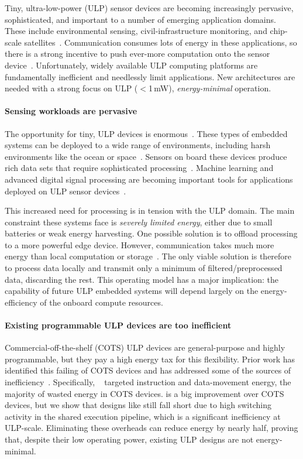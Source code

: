 Tiny, ultra-low-power (ULP) sensor devices are becoming increasingly pervasive, sophisticated, and important to a number of emerging application domains.
% 
These include environmental sensing, civil-infrastructure monitoring, and chip-scale satellites~\cite{kicksat2}.
%
Communication consumes lots of energy in these applications,
so there is a strong incentive to push ever-more computation onto the sensor device~\cite{sonic}.
% 
Unfortunately, widely available ULP computing platforms are fundamentally inefficient and needlessly limit applications.
%
New architectures are needed with a strong focus on ULP ($<$1\,mW), \emph{energy-minimal} operation.

\paragraph{Sensing workloads are pervasive}
The opportunity for tiny, ULP devices is enormous~\cite{lucia2017intermittent}.
% 
These types of embedded systems can be deployed to a wide range of environments, including harsh environments like the ocean or space~\cite{denby2020orbital}.
%
Sensors on board these devices produce rich data sets that require sophisticated processing~\cite{naderiparizi2018towards,nardello2019camaroptera}.
% 
Machine learning and advanced digital signal processing are becoming important tools for applications deployed on ULP sensor devices~\cite{sonic}.

This increased need for processing is in tension with the ULP domain.
%
The main constraint these systems face is \emph{severely limited energy},
either due to small batteries or weak energy harvesting.
% 
One possible solution is to offload processing to a more powerful edge device.
% 
However, communication takes much more energy than local computation or storage~\cite{sonic,zebranet}.
% 
The only viable solution is therefore to process data locally and transmit only a minimum of filtered/preprocessed data,
discarding the rest.
%
This operating model has a major implication: the capability of future ULP embedded systems will depend largely on the energy-efficiency of the onboard compute resources.
%

\paragraph{Existing programmable ULP devices are too inefficient}
Commercial-off-the-shelf (COTS) ULP devices are 
% 
general-purpose and highly programmable,
but they pay a high energy tax for this flexibility.
% 
Prior work has identified this failing of COTS devices and has addressed some of the sources of inefficiency~\cite{dally:ieee08:elm,manic,hempstead2005ultra,warneke200417,nazhandali2005energy}.
% 
Specifically, \manic~\cite{manic} targeted instruction and data-movement energy, the majority of wasted energy in COTS devices.
%
\manic is a big improvement over COTS devices, but
%
we show that designs like \manic still fall short due to high switching activity
in the shared execution pipeline,
which is a significant inefficiency at ULP-scale.
%
Eliminating these overheads can reduce energy by nearly half, proving that, despite their low operating power,
existing ULP designs are not energy-minimal.

